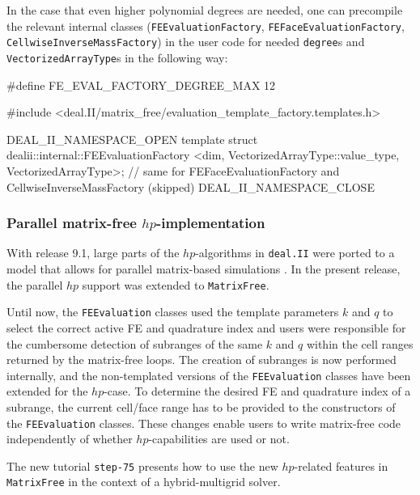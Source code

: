 \documentclass{ansarticle-preprint}
\newcommand{\specialword}[1]{\texttt{#1}}
\newcommand{\dealii}{{\specialword{deal.II}}\xspace}
\begin{document}
In the case that even higher polynomial degrees are needed, one can precompile the
relevant internal classes
(\texttt{FEEvaluationFactory}, \texttt{FEFaceEvaluationFactory}, \texttt{CellwiseInverseMassFactory}) in the user code for needed \texttt{degree}s
and \texttt{VectorizedArrayType}s in the following way:
\begin{c++}
#define FE_EVAL_FACTORY_DEGREE_MAX 12

#include <deal.II/matrix_free/evaluation_template_factory.templates.h>

DEAL_II_NAMESPACE_OPEN
template struct dealii::internal::FEEvaluationFactory
  <dim, VectorizedArrayType::value_type, VectorizedArrayType>;
// same for FEFaceEvaluationFactory and CellwiseInverseMassFactory (skipped)
DEAL_II_NAMESPACE_CLOSE
\end{c++}


\subsubsection{Parallel matrix-free $hp$-implementation}\label{subsubsection:mf:hp}

With release 9.1, large parts of the $hp$-algorithms
in \dealii were ported to a model that allows for
parallel matrix-based simulations \cite{dealII91}. In the present
release, the parallel $hp$ support was extended to \texttt{MatrixFree}.

Until now, the \texttt{FEEvaluation} classes used the template
parameters $k$ and $q$ to select the correct active FE and quadrature
index and users were responsible for the cumbersome detection of 
subranges of the same $k$ and $q$ within the cell ranges returned by the 
matrix-free loops.
The creation of subranges is now performed internally, and the non-templated versions
of the \texttt{FEEvaluation} classes have been extended for the $hp$-case. To determine
the desired FE and quadrature index of a subrange, the current cell/face range has to be provided
to the constructors of the \texttt{FEEvaluation} classes. These changes enable
users to write matrix-free code independently of whether $hp$-capabilities are used or not.

The new tutorial \texttt{step-75} presents how to use the new $hp$-related features in \texttt{MatrixFree}
in the context of a hybrid-multigrid solver.
\end{document}
